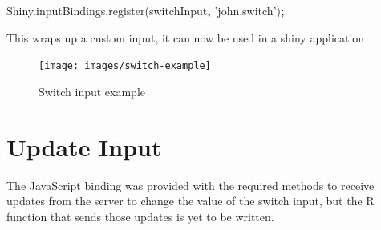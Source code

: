 \documentclass[10pt,]{krantz}
\makeatletter
\newenvironment{Shaded}{\begin{snugshade}}{\end{snugshade}}
\newcommand{\AttributeTok}[1]{\textcolor[rgb]{0.61,0.61,0.61}{#1}}
\newcommand{\ControlFlowTok}[1]{\textcolor[rgb]{0.27,0.27,0.27}{\textbf{#1}}}
\newcommand{\KeywordTok}[1]{\textcolor[rgb]{0.27,0.27,0.27}{\textbf{#1}}}
\newcommand{\NormalTok}[1]{#1}
\newcommand{\OperatorTok}[1]{\textcolor[rgb]{0.43,0.43,0.43}{\textbf{#1}}}
\newcommand{\OtherTok}[1]{\textcolor[rgb]{0.37,0.37,0.37}{#1}}
\newcommand{\StringTok}[1]{\textcolor[rgb]{0.5,0.5,0.5}{#1}}
\newcommand{\VariableTok}[1]{\textcolor[rgb]{0,0,0}{#1}}
\newenvironment{kframe}{%
\medskip{}
\setlength{\fboxsep}{.8em}
 \def\at@end@of@kframe{}%
 \ifinner\ifhmode%
  \def\at@end@of@kframe{\end{minipage}}%
  \begin{minipage}{\columnwidth}%
 \fi\fi%
 \def\FrameCommand##1{\hskip\@totalleftmargin \hskip-\fboxsep
 \colorbox{shadecolor}{##1}\hskip-\fboxsep
     \hskip-\linewidth \hskip-\@totalleftmargin \hskip\columnwidth}%
 \MakeFramed {\advance\hsize-\width
   \@totalleftmargin\z@ \linewidth\hsize
   \@setminipage}}%
 {\par\unskip\endMakeFramed%
 \at@end@of@kframe}
\renewenvironment{Shaded}{\begin{kframe}}{\end{kframe}}
\makeatother
\begin{document}
\begin{Shaded}
\begin{Highlighting}[]
\VariableTok{Shiny}\NormalTok{.}\VariableTok{inputBindings}\NormalTok{.}\AttributeTok{register}\NormalTok{(switchInput}\OperatorTok{,} \StringTok{'john.switch'}\NormalTok{)}\OperatorTok{;}
\end{Highlighting}
\end{Shaded}

This wraps up a custom input, it can now be used in a shiny application

\begin{Shaded}
\end{Shaded}

\begin{figure}[H]

{\centering \texttt{[image: images/switch-example]} 

}

\caption{Switch input example}\label{fig:switch-example}
\end{figure}

\hypertarget{shiny-input-update}{%
\section{Update Input}\label{shiny-input-update}}

The JavaScript binding was provided with the required methods to receive updates from the server to change the value of the switch input, but the R function that sends those updates is yet to be written.
\end{document}
